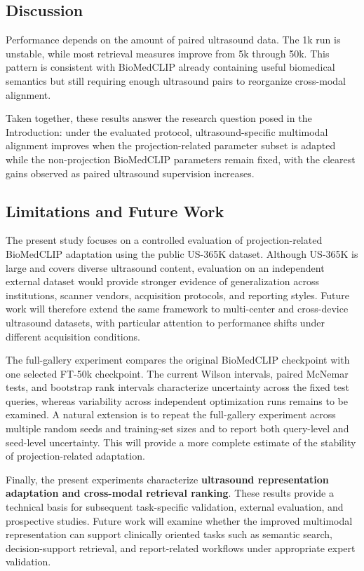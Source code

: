 \documentclass[runningheads]{llncs}
\begin{document}
\subsection{Discussion}

Performance depends on the amount of paired ultrasound data. The 1k run is unstable, while most retrieval measures improve from 5k through 50k. This pattern is consistent with BioMedCLIP already containing useful biomedical semantics but still requiring enough ultrasound pairs to reorganize cross-modal alignment.

Taken together, these results answer the research question posed in the Introduction: under the evaluated protocol, ultrasound-specific multimodal alignment improves when the projection-related parameter subset is adapted while the non-projection BioMedCLIP parameters remain fixed, with the clearest gains observed as paired ultrasound supervision increases.

\subsection{Limitations and Future Work}

The present study focuses on a controlled evaluation of projection-related BioMedCLIP adaptation using the public US-365K dataset. Although US-365K is large and covers diverse ultrasound content, evaluation on an independent external dataset would provide stronger evidence of generalization across institutions, scanner vendors, acquisition protocols, and reporting styles. Future work will therefore extend the same framework to multi-center and cross-device ultrasound datasets, with particular attention to performance shifts under different acquisition conditions.

The full-gallery experiment compares the original BioMedCLIP checkpoint with one selected FT-50k checkpoint. The current Wilson intervals, paired McNemar tests, and bootstrap rank intervals characterize uncertainty across the fixed test queries, whereas variability across independent optimization runs remains to be examined. A natural extension is to repeat the full-gallery experiment across multiple random seeds and training-set sizes and to report both query-level and seed-level uncertainty. This will provide a more complete estimate of the stability of projection-related adaptation.

Finally, the present experiments characterize \textbf{ultrasound representation adaptation and cross-modal retrieval ranking}. These results provide a technical basis for subsequent task-specific validation, external evaluation, and prospective studies. Future work will examine whether the improved multimodal representation can support clinically oriented tasks such as semantic search, decision-support retrieval, and report-related workflows under appropriate expert validation.
\end{document}

